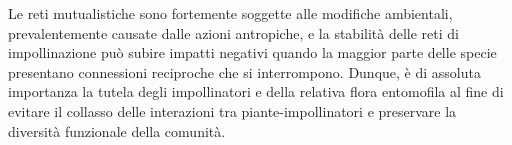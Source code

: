 \documentclass[main.tex]{subfiles}
\begin{document}
{Le reti mutualistiche sono fortemente soggette alle modifiche ambientali, prevalentemente causate dalle azioni antropiche, e la stabilità delle reti di impollinazione può subire impatti negativi quando la maggior parte delle specie presentano connessioni reciproche che si interrompono. Dunque, è di assoluta importanza la tutela degli impollinatori e della relativa flora entomofila al fine di evitare il collasso delle interazioni tra piante-impollinatori e preservare la diversità funzionale della comunità.
}

\clearpage
\null
\thispagestyle{empty}
\clearpage
\end{document}
